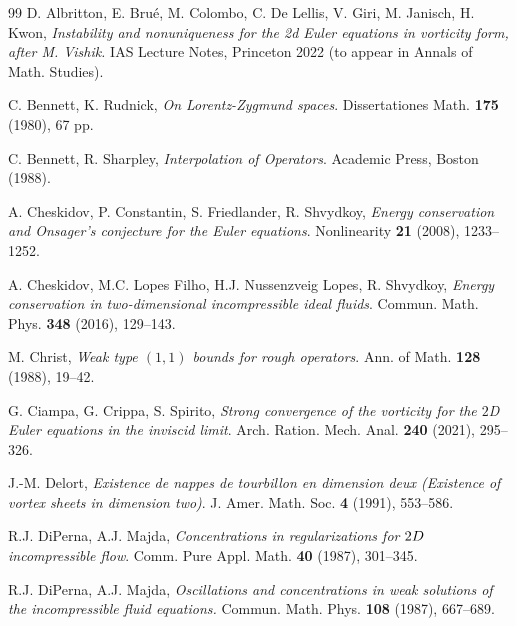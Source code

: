 \documentclass[11pt, a4paper,leqno]{amsart}
\theoremstyle{plain}
\numberwithin{equation}{section}
\theoremstyle{definition}
\theoremstyle{remark}
\begin{document}
\begin{thebibliography}{99}                                                                                               %
D. Albritton, E. Bru\'{e}, M. Colombo, C. De Lellis, V. Giri,
M. Janisch, H. Kwon, \emph{Instability and nonuniqueness for the 2d Euler
equations in vorticity form, after M. Vishik.} IAS Lecture Notes, Princeton
2022 (to appear in Annals of Math. Studies).

C. Bennett, K. Rudnick, \emph{On Lorentz-Zygmund spaces}.
Dissertationes Math. \textbf{175} (1980), 67 pp.

C. Bennett, R. Sharpley, \emph{Interpolation of Operators}.
Academic Press, Boston (1988).



 A. Cheskidov, P. Constantin, S. Friedlander, R. Shvydkoy, \emph{Energy conservation and Onsager's conjecture for the Euler equations}. Nonlinearity \textbf{21} (2008), 1233--1252.

A. Cheskidov, M.C. Lopes Filho, H.J. Nussenzveig Lopes, R.
Shvydkoy, \emph{Energy conservation in two-dimensional incompressible ideal fluids}. Commun. Math. Phys. \textbf{348} (2016), 129--143.

M. Christ, \emph{Weak type $(1, 1)$ bounds for rough operators}.
Ann. of Math. \textbf{128 }(1988), 19--42.


 G. Ciampa, G. Crippa, S. Spirito, \emph{Strong convergence of the vorticity for the \emph{$2$D} Euler equations in the inviscid limit}. Arch. Ration. Mech. Anal. \textbf{240} (2021), 295--326.

J.-M. Delort, \emph{Existence de nappes de tourbillon en
dimension deux (Existence of vortex sheets in dimension two)}. J. Amer. Math.
Soc. \textbf{4 }(1991), 553--586.
%


R.J. DiPerna, A.J. Majda, \emph{Concentrations in
regularizations for $2\emph{D}$ incompressible flow}. Comm. Pure Appl. Math.
\textbf{40 }(1987), 301--345.

R.J. DiPerna, A.J. Majda, \emph{Oscillations and
concentrations in weak solutions of the incompressible fluid equations.}
Commun. Math. Phys. \textbf{108} (1987), 667--689.


\end{thebibliography}
\end{document}
